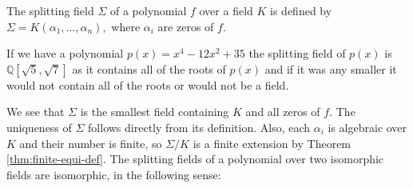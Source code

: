 \begin{definition}
    The splitting field $\Sigma$ of a polynomial $f$ over a field $K$ is defined by $\Sigma = K(\alpha_1, \ldots, \alpha_n), $ where $\alpha_i$ are zeros of $f$. 
\end{definition}
\begin{example}
	If we have a polynomial \(p(x) = x^4 - 12x^2 + 35\) the splitting field of \(p(x)\) is \(\mathbb{Q}[\sqrt{5},\sqrt{7}]\) as it contains all of the roots of \(p(x)\) and if it was any smaller it would not contain all of the roots or would not be a field.
\end{example}

We see that $\Sigma$ is the smallest field containing $K$ and all zeros of $f$. The uniqueness of $\Sigma$ follows directly from its definition. Also, each $\alpha_i$ is algebraic over $K$ and their number is finite, so $\Sigma / K$ is a finite extension by Theorem \ref{thm:finite-equi-def}. 
%
%
The splitting fields of a polynomial over two isomorphic fields are isomorphic, in the following sense:

